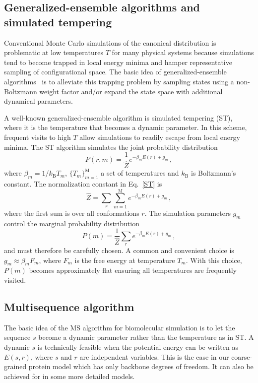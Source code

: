 \documentclass[
aip,
rsi,%
amsmath,amssymb,
reprint,%
]{revtex4-1}
\newcommand	 {\sbar}	{{s}}
\newcommand	 {\rbar}	{{r}}
\begin{document}
\subsection{Generalized-ensemble algorithms and simulated tempering}
\noindent
Conventional Monte Carlo simulations of the canonical distribution is problematic at low temperatures $T$ for many physical systems because simulations tend to become trapped in local energy minima and hamper representative sampling of configurational space. The basic idea of generalized-ensemble algorithms~\cite{Mitsutake2001} is to alleviate this trapping problem by sampling states using a non-Boltzmann weight factor and/or expand the state space with additional dynamical parameters. 

A well-known generalized-ensemble algorithm is simulated tempering (ST),~\cite{Marinari1992,Lyubartsev1992} where it is the temperature that becomes a dynamic parameter. In this scheme, frequent visits to high $T$ allow simulations to readily escape from local energy minima. The ST algorithm simulates the joint probability distribution 
\begin{equation}
P(\rbar,m) =\dfrac{1}{\hat{Z}} e^{-\beta_m E(\rbar) + g_m}\,,
\label{ST}
\end{equation}
where  $\beta_m=1/k_\mathrm{B} T_m$, $\{T_m\}_{m=1}^\mathrm{M}$ a set of temperatures and $k_\mathrm{B}$ is Boltzmann's constant. The normalization constant in Eq.~\ref{ST} is  
\begin{equation}
\hat{Z} = \sum_r \sum_{m=1}^{\mathrm{M}}e^{-\beta_m E(\rbar) + g_m}\,,
\end{equation}
where the first sum is over all conformations $\rbar$. The simulation parameters $g_m$ control the marginal probability distribution
\begin{equation}
P(m) = \frac{1}{\hat{Z}}\sum_r e^{-\beta_m E(\rbar) + g_m} \,,
\end{equation}
and must therefore be carefully chosen. A common and convenient choice is $g_m\approx \beta_m F_m$, where $F_m$ is the free energy at temperature $T_m$. With this choice, $P(m)$ becomes approximately flat ensuring all temperatures are frequently visited. 

\subsection{Multisequence algorithm}
\noindent 
The basic idea of the MS algorithm for biomolecular simulation is to let the sequence $\sbar$ become a dynamic parameter rather than the temperature as in ST. A dynamic $\sbar$ is technically feasible when the potential energy can be written as $E(\sbar,\rbar)$, where $\sbar$ and $\rbar$ are independent variables. This is the case in our coarse-grained protein model which has only backbone degrees of freedom. It can also be achieved for in some more detailed models.~\cite{Bhattacherjee2013,Wallin2017} 
\end{document}
